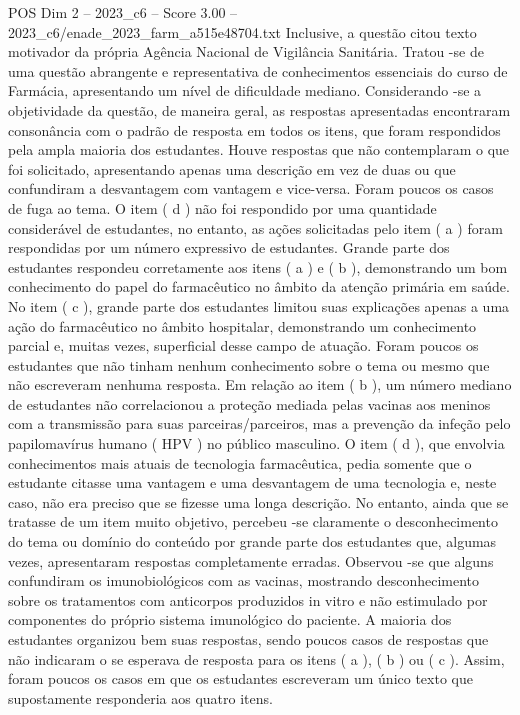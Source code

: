 \begin{textsample}{POS Dim 2 – 2023\_c6 – Score 3.00 – 2023\_c6/enade\_2023\_farm\_a515e48704.txt}
Inclusive, a questão citou texto motivador da própria Agência Nacional de Vigilância Sanitária.
Tratou -se de uma questão abrangente e representativa de conhecimentos essenciais do curso de Farmácia, apresentando um nível de dificuldade mediano.
Considerando -se a objetividade da questão, de maneira geral, as respostas apresentadas encontraram consonância com o padrão de resposta em todos os itens, que foram respondidos pela ampla maioria dos estudantes.
Houve respostas que não contemplaram o que foi solicitado, apresentando apenas uma descrição em vez de duas ou que confundiram a desvantagem com vantagem e vice-versa.
Foram poucos os casos de fuga ao tema.
O item ( d ) não foi respondido por uma quantidade considerável de estudantes, no entanto, as ações solicitadas pelo item ( a ) foram respondidas por um número expressivo de estudantes.
Grande parte dos estudantes respondeu corretamente aos itens ( a ) e ( b ), demonstrando um bom conhecimento do papel do farmacêutico no âmbito da atenção primária em saúde.
No item ( c ), grande parte dos estudantes limitou suas explicações apenas a uma ação do farmacêutico no âmbito hospitalar, demonstrando um conhecimento parcial e, muitas vezes, superficial desse campo de atuação.
Foram poucos os estudantes que não tinham nenhum conhecimento sobre o tema ou mesmo que não escreveram nenhuma resposta.
Em relação ao item ( b ), um número mediano de estudantes não correlacionou a proteção mediada pelas vacinas aos meninos com a transmissão para suas parceiras/parceiros, mas a prevenção da infeção pelo papilomavírus humano ( HPV ) no público masculino.
O item ( d ), que envolvia conhecimentos mais atuais de tecnologia farmacêutica, pedia somente que o estudante citasse uma vantagem e uma desvantagem de uma tecnologia e, neste caso, não era preciso que se fizesse uma longa descrição.
No entanto, ainda que se tratasse de um item muito objetivo, percebeu -se claramente o desconhecimento do tema ou domínio do conteúdo por grande parte dos estudantes que, algumas vezes, apresentaram respostas completamente erradas.
Observou -se que alguns confundiram os imunobiológicos com as vacinas, mostrando desconhecimento sobre os tratamentos com anticorpos produzidos in vitro e não estimulado por componentes do próprio sistema imunológico do paciente.
A maioria dos estudantes organizou bem suas respostas, sendo poucos casos de respostas que não indicaram o se esperava de resposta para os itens ( a ), ( b ) ou ( c ).
Assim, foram poucos os casos em que os estudantes escreveram um único texto que supostamente responderia aos quatro itens.

\end{textsample}
